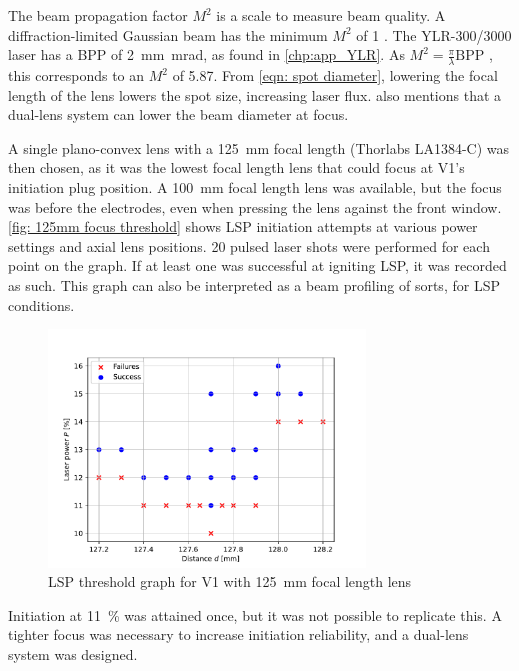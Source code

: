             The beam propagation factor $M^2$ is a scale to measure beam quality. A diffraction-limited Gaussian beam has the minimum $M^2$ of 1 \textcite{hechtUnderstandingLasersEntry2019}. The YLR-300/3000 laser has a BPP of \qty{2}{mm.mrad}, as found in \autoref{chp:app_YLR}. As $M^2 = \frac{\pi}{\lambda} \text{BPP}$ \cite{paschottaBeamParameterProduct}, this corresponds to an $M^2$ of 5.87. From \autoref{eqn: spot diameter}, lowering the focal length of the lens lowers the spot size, increasing laser flux. \textcite{LensTutorial} also mentions that a dual-lens system can lower the beam diameter at focus.

            A single plano-convex lens with a \qty{125}{mm} focal length (Thorlabs LA1384-C) was then chosen, as it was the lowest focal length lens that could focus at V1's initiation plug position. A \qty{100}{mm} focal length lens was available, but the focus was before the electrodes, even when pressing the lens against the front window. \autoref{fig: 125mm focus threshold} shows LSP initiation attempts at various power settings and axial lens positions. 20 pulsed laser shots were performed for each point on the graph. If at least one was successful at igniting LSP, it was recorded as such. This graph can also be interpreted as a beam profiling of sorts, for LSP conditions.
            \begin{figure}[!ht]
                \centering
                \includegraphics[width=0.75\textwidth]{assets/4 experiments/125mm_focus_threshold.pdf}
                \caption{LSP threshold graph for V1 with \qty{125}{mm} focal length lens}
                \label{fig: 125mm focus threshold}
            \end{figure}
             Initiation at \qty{11}{\%} was attained once, but it was not possible to replicate this. A tighter focus was necessary to increase initiation  reliability, and a dual-lens system was designed.

